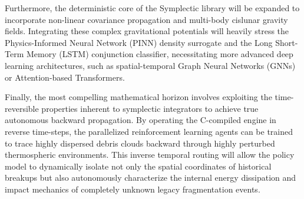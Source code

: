 \documentclass[letterpaper,11pt]{AAS}
\begin{document}
Furthermore, the deterministic core of the Symplectic library will be expanded to incorporate non-linear covariance propagation and multi-body cislunar gravity fields. Integrating these complex gravitational potentials will heavily stress the Physics-Informed Neural Network (PINN) density surrogate and the Long Short-Term Memory (LSTM) conjunction classifier, necessitating more advanced deep learning architectures, such as spatial-temporal Graph Neural Networks (GNNs) or Attention-based Transformers.

Finally, the most compelling mathematical horizon involves exploiting the time-reversible properties inherent to symplectic integrators to achieve true autonomous backward propagation. By operating the C-compiled engine in reverse time-steps, the parallelized reinforcement learning agents can be trained to trace highly dispersed debris clouds backward through highly perturbed thermospheric environments. This inverse temporal routing will allow the policy model to dynamically isolate not only the spatial coordinates of historical breakups but also autonomously characterize the internal energy dissipation and impact mechanics of completely unknown legacy fragmentation events.
\end{document}
